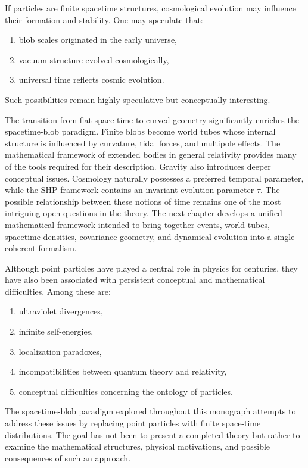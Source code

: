 If particles are finite spacetime structures, cosmological evolution may
influence their formation and stability.
One may speculate that:
\begin{enumerate}
\item blob scales originated in the early universe,
\item vacuum structure evolved cosmologically,
\item universal time reflects cosmic evolution.
\end{enumerate}
Such possibilities remain highly speculative but conceptually
interesting.

The transition from flat space-time to curved geometry significantly
enriches the spacetime-blob paradigm. Finite blobs become world tubes
whose internal structure is influenced by curvature, tidal forces, and
multipole effects. The mathematical framework of extended bodies in
general relativity provides many of the tools required for their
description.
Gravity also introduces deeper conceptual issues. Cosmology naturally
possesses a preferred temporal parameter, while the SHP framework
contains an invariant evolution parameter \(\tau\). The possible
relationship between these notions of time remains one of the most
intriguing open questions in the theory.
The next chapter develops a unified mathematical framework intended to
bring together events, world tubes, spacetime densities, covariance
geometry, and dynamical evolution into a single coherent formalism.

\label{Conclusions and Future Directions}
Although point particles have played a central role in physics for
centuries, they have also been associated with persistent conceptual and
mathematical difficulties. Among these are:
\begin{enumerate}
\item ultraviolet divergences,
\item infinite self-energies,
\item localization paradoxes,
\item incompatibilities between quantum theory and relativity,
\item conceptual difficulties concerning the ontology of particles.
\end{enumerate}
The spacetime-blob paradigm explored throughout this monograph attempts
to address these issues by replacing point particles with finite
space-time distributions.
The goal has not been to present a completed theory but rather to
examine the mathematical structures, physical motivations, and possible
consequences of such an approach.

